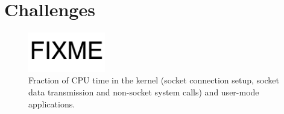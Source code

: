 \section{Challenges}
\label{sec:background}


\begin{figure}[t]
	\centering
	\includegraphics[width=0.3\textwidth]{images/fixme}
	\caption{Fraction of CPU time in the kernel (socket connection setup, socket data transmission and non-socket system calls) and user-mode applications.}
	\label{fig:socket-kernel-time}
\end{figure}





